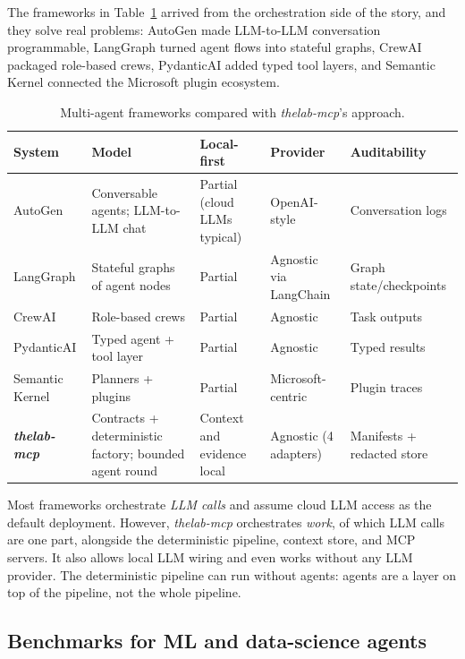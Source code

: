 The frameworks in Table~\ref{tab:frameworks} arrived from the orchestration side of the story, and they solve real problems: AutoGen \cite{wu2023autogen} made LLM-to-LLM conversation programmable, LangGraph \cite{langgraph2024} turned agent flows into stateful graphs, CrewAI \cite{crewai2024} packaged role-based crews, PydanticAI \cite{pydanticai2024} added typed tool layers, and Semantic Kernel \cite{semantickernel2024} connected the Microsoft plugin ecosystem.

\begin{table}[H]
\centering
\caption{Multi-agent frameworks compared with \emph{thelab-mcp}'s approach.}
\label{tab:frameworks}
\small
\begin{tabular}{p{2.6cm}p{3.3cm}p{2.6cm}p{2.6cm}p{2.6cm}}
\toprule
\textbf{System} & \textbf{Model} & \textbf{Local-first} & \textbf{Provider} & \textbf{Auditability} \\
\midrule
AutoGen \cite{wu2023autogen} & Conversable agents; LLM-to-LLM chat & Partial (cloud LLMs typical) & OpenAI-style & Conversation logs \\
LangGraph \cite{langgraph2024} & Stateful graphs of agent nodes & Partial & Agnostic via LangChain & Graph state/checkpoints \\
CrewAI \cite{crewai2024} & Role-based crews & Partial & Agnostic & Task outputs \\
PydanticAI \cite{pydanticai2024} & Typed agent + tool layer & Partial & Agnostic & Typed results \\
Semantic Kernel \cite{semantickernel2024} & Planners + plugins & Partial & Microsoft-centric & Plugin traces \\
\midrule
\textbf{\emph{thelab-mcp}} & Contracts + deterministic factory; bounded agent round & Context and evidence local & Agnostic (4 adapters) & Manifests + redacted store \\
\bottomrule
\end{tabular}
\end{table}

Most frameworks orchestrate \emph{LLM calls} and assume cloud LLM access as the default deployment. However, \emph{thelab-mcp} orchestrates \emph{work}, of which LLM calls are one part, alongside the deterministic pipeline, context store, and MCP servers. It also allows local LLM wiring and even works without any LLM provider. The deterministic pipeline can run without agents: agents are a layer on top of the pipeline, not the whole pipeline.


\subsection{Benchmarks for ML and data-science agents}
\label{sec:bg-benchmarks}


